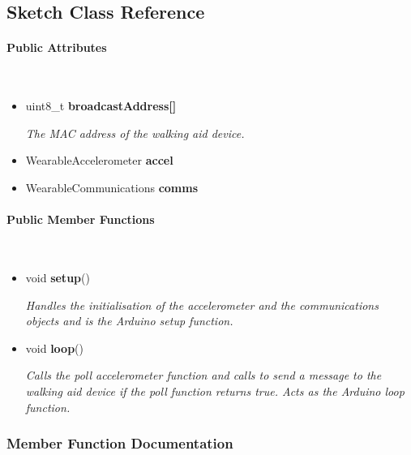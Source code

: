 \subsection{Sketch Class Reference}
\label{subsec:sketch}\mbox{}

    \paragraph{Public Attributes}\mbox{}\\

        \begin{itemize}
            \item uint8\_t \textbf{broadcastAddress[]}
            
                \quad \quad \textit{The MAC address of the walking aid device.}

            \item WearableAccelerometer \textbf{accel}

            \item WearableCommunications \textbf{comms}\\

        \end{itemize}


    \paragraph{Public Member Functions}\mbox{}\\

        \begin{itemize}
            \item void \textbf{setup}() 
            
                \quad \quad \textit{Handles the initialisation of the accelerometer and the communications objects and is the Arduino setup function.}

            \item void \textbf{loop}() 
            
                \quad \quad \textit{Calls the poll accelerometer function and calls to send a message to the walking aid device if the poll function returns true. Acts as the Arduino loop function.}\\
        \end{itemize}


    \subsubsection{Member Function Documentation}\mbox{}


